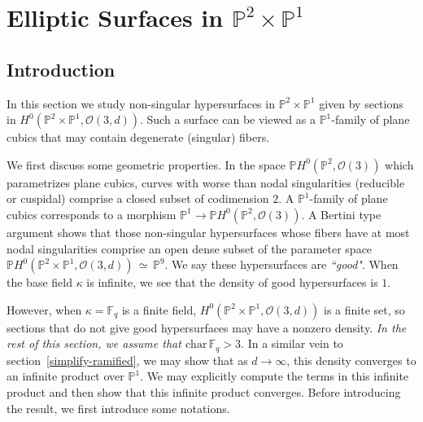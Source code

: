 \documentclass[12pt]{article}
\theoremstyle{plain}
\theoremstyle{definition}
\newcommand{\IF}{\mathbb{F}}
\newcommand{\IP}{\mathbb{P}}
\newcommand{\sO}{\mathcal{O}}
\newcommand\iso{{\, \simeq \,}}
\newcommand{\<}{\langle}
\renewcommand{\>}{\rangle}
\begin{document}
\section{Elliptic Surfaces in $\IP^2 \times \IP^1$}
\subsection{Introduction}
In this section we study non-singular hypersurfaces in $\IP^2 \times \IP^1$ given by sections in $H^0(\IP^2 \times \IP^1, \sO(3, d))$. Such a surface can be viewed as a $\IP^1$-family of plane cubics that may contain degenerate (singular) fibers.

We first discuss some geometric properties. In the space $\IP H^0(\IP^2, \sO(3))$ which parametrizes plane cubics, curves with worse than nodal singularities (reducible or cuspidal) comprise a closed subset of codimension $2$. A $\IP^1$-family of plane cubics corresponds to a morphism $\IP^1 \to \IP H^0(\IP^2, \sO(3))$. A Bertini type argument shows that those non-singular hypersurfaces whose fibers have at most nodal singularities comprise an open dense subset of the parameter space $\IP H^0(\IP^2 \times \IP^1, \sO(3, d)) \iso \IP^9$. We say these hypersurfaces are \textit{``good"}. When the base field $\kappa$ is infinite, we see that the density of good hypersurfaces is $1$.

However, when $\kappa = \IF_q$ is a finite field, $H^0(\IP^2 \times \IP^1, \sO(3, d))$ is a finite set, so sections that do not give good hypersurfaces may have a nonzero density. \textit{In the rest of this section, we assume that $\mathrm{char\,}\IF_q > 3$}. In a similar vein to section~\ref{simplify-ramified}, we may show that as $d \to \infty$, this density converges to an infinite product over $\IP^1$. We may explicitly compute the terms in this infinite product and then show that this infinite product converges. Before introducing the result, we first introduce some notations. 
\end{document}
